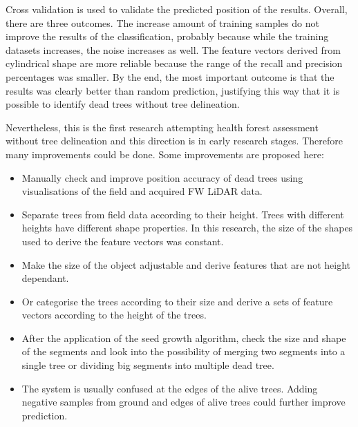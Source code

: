 \documentclass{subfiles}
\begin{document}
\par Cross validation is used to validate the predicted position of the results. Overall, there are three outcomes. The increase amount of training samples do not improve the results of the classification, probably because while the training datasets increases, the noise increases as well. The feature vectors derived from cylindrical shape are more reliable because the range of the recall and precision percentages was smaller. By the end, the most important outcome is that the results was clearly better than random prediction, justifying this way that it is possible to identify dead trees without tree delineation.

\par  Nevertheless, this is the first research attempting health forest assessment without tree delineation and this direction is in early research stages. Therefore many improvements could be done. Some improvements are proposed here: 

\begin{itemize}
	\item Manually check and improve position accuracy of dead trees using visualisations of the field and acquired FW LiDAR data. 
	\item Separate trees from field data according to their height. Trees with different heights have different shape properties. In this research, the size of the shapes used to derive the feature vectors was constant.
	\item Make the size of the object adjustable and derive features that are not height dependant.
	\item Or categorise the trees according to their size and derive a sets of feature vectors according to the height of the trees.
	\item After the application of the seed growth algorithm, check the size and shape of the segments and look into the possibility of merging two segments into a single tree or dividing big segments into multiple dead tree.
	\item The system is usually confused at the edges of the alive trees. Adding negative samples from ground and edges of alive trees could further improve prediction. 
\end{itemize}
\end{document}
